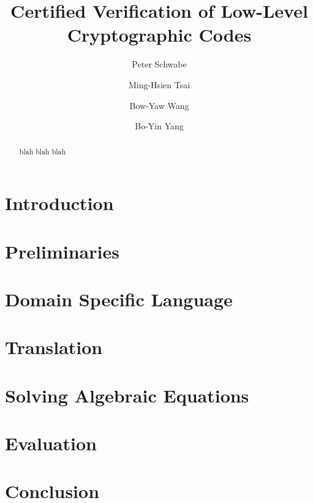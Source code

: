 \documentclass{llncs}
\title{Certified Verification of Low-Level Cryptographic Codes}
\author{
Peter Schwabe\inst{2}
\and
Ming-Hsien Tsai\inst{1}
\and
Bow-Yaw Wang\inst{1}
\and
Bo-Yin Yang\inst{1}
%
}
\institute
{
Institute of Information Science\\
Academia Sinica\\
128 Section 2 Academia Road, Taipei 115-29, Taiwan\\
\email{mhtsai208@gmail.com, bywang@iis.sinica.edu.tw, by@crypto.tw}
\and
Radboud University Nijmegen\\
Digital Security Group\\
PO Box 9010, 6500GL Nijmegen, The Netherlands\\
\email{peter@cryptojedi.org}
}
\author{\vspace*{-1cm} }
\institute{\vspace*{-1cm}\ }
\begin{document}
\maketitle

\begin{abstract}
  blah blah blah
\end{abstract}

\section{Introduction}
\label{section:introduction}


\section{Preliminaries}
\label{section:preliminaries}


\section{Domain Specific Language}
\label{section:domain-specific-language}


\section{Translation}
\label{section:translation}


\section{Solving Algebraic Equations}
\label{section:solving-algebraic-equations}


\section{Evaluation}
\label{section:evaluation}


\section{Conclusion}
\label{section:conclusion}



%


\end{document}
